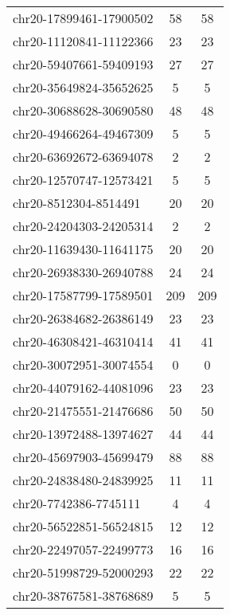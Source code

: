 \documentclass[10pt,letterpaper]{article}
\begin{document}
{\begin{longtable}{lSS}
	chr20-17899461-17900502 & 58     & 58                    \\
	chr20-11120841-11122366 & 23     & 23                    \\
	chr20-59407661-59409193 & 27     & 27                    \\
	chr20-35649824-35652625 & 5      & 5                     \\
	chr20-30688628-30690580 & 48     & 48                    \\
	chr20-49466264-49467309 & 5      & 5                     \\
	chr20-63692672-63694078 & 2      & 2                     \\
	chr20-12570747-12573421 & 5      & 5                     \\
	chr20-8512304-8514491   & 20     & 20                    \\
	chr20-24204303-24205314 & 2      & 2                     \\
	chr20-11639430-11641175 & 20     & 20                    \\
	chr20-26938330-26940788 & 24     & 24                    \\
	chr20-17587799-17589501 & 209    & 209                   \\
	chr20-26384682-26386149 & 23     & 23                    \\
	chr20-46308421-46310414 & 41     & 41                    \\
	chr20-30072951-30074554 & 0      & 0                     \\
	chr20-44079162-44081096 & 23     & 23                    \\
	chr20-21475551-21476686 & 50     & 50                    \\
	chr20-13972488-13974627 & 44     & 44                    \\
	chr20-45697903-45699479 & 88     & 88                    \\
	chr20-24838480-24839925 & 11     & 11                    \\
	chr20-7742386-7745111   & 4      & 4                     \\
	chr20-56522851-56524815 & 12     & 12                    \\
	chr20-22497057-22499773 & 16     & 16                    \\
	chr20-51998729-52000293 & 22     & 22                    \\
	chr20-38767581-38768689 & 5      & 5                     \\

\end{longtable}}
\end{document}
